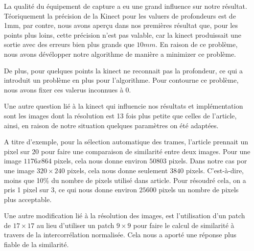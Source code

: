 \documentclass[a4paper,12pt]{article}
\begin{document}

La qualité du équipement de capture a eu une grand influence sur notre
résultat. Téoriquement la précision de la Kinect pour les valuers de
profondeurs est de 1mm, par contre, nous avons aperçu dans nos
premières résultat que, pour les points plus loins, cette
précision n'est pas valable, car la kinect produissait une sortie avec
des erreurs bien plus grands que $10 mm$. 
En raison de ce problème, nous avons dévélopper notre algorithme de
manière a minimizer ce problème.

De plus, pour quelques points la kinect ne reconnait pas la
profondeur, ce qui a introduit un problème en plus pour l'algorithme. 
Pour contourne ce problème, nous avons fixer ces valerus inconnues à
0. 

Une autre question lié à la kinect qui influencie nos résultats et
implémentation sont les images dont la résolution est 13 fois plus
petite que celles de l'article, ainsi, en raison de notre situation
quelques paramètres on été adaptées.

A titre d'exemple, pour la sélection automatique des trames, l'article
prennait un pixel sur 20 pour faire une comparaison de similarité
entre deux images. Pour une image $1176 x 864$ pixels, cela nous donne
environ $50803$ pixels. Dans notre cas por une image $320 \times 240$ pixels,
cela nous donne seulement $3840$ pixels. C'est-à-dire, moins que 10\% du
nombre de pixels utilisé dans article. Pour résoudré cela, on a pris 1
pixel sur 3, ce qui nous donne environ $25600$ pixels un nombre de
pixels plus acceptable.

Une autre modification lié à la résolution des images, est
l'utilisation d'un patch de $17 \times 17$ au lieu d'utiliser un patch
$9 \times 9$ pour faire le calcul de similarité à travers de la
intercorrélation normalisée. Cela nous a aporté une réponse plus
fiable de la similarité.   



\nocite{Beeler:2010:HSC:1778765.1778777}

\begin{small}
  
\end{small}
\section*{}
\end{document}
